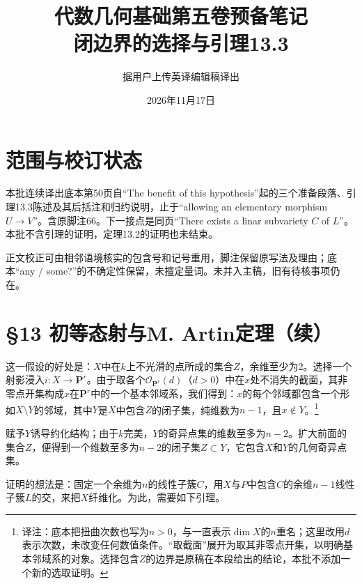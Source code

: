 \documentclass[openany,fontset=fandol]{ctexbook}
\newcommand{\note}[1]{\footnote{译注：#1}}
\begin{document}
\title{代数几何基础第五卷预备笔记\\闭边界的选择与引理13.3}
\author{据用户上传英译编辑稿译出}
\date{2026年11月17日}
\maketitle
\chapter*{范围与校订状态}
本批连续译出底本第50页自“The benefit of this hypothesis”起的三个准备段落、引理13.3陈述及其后括注和归约说明，止于“allowing an elementary morphism $U\to V$”。含原脚注66。下一接点是同页“There exists a linar subvariety $C$ of $L$”。本批不含引理的证明，定理13.2的证明也未结束。

正文校正可由相邻语境核实的包含号和记号重用，脚注保留原写法及理由；底本“any / some?”的不确定性保留，未擅定量词。未并入主稿，旧有待核事项仍在。
\chapter*{§13 初等态射与M. Artin定理（续）}
这一假设的好处是：$X$中在$k$上不光滑的点所成的集合$Z$，余维至少为2。选择一个射影浸入$i\colon X\to\mathbf P^r$。由于取各个$\mathcal O_{\mathbf P^r}(d)$（$d>0$）中在$x$处不消失的截面，其非零点开集构成$x$在$\mathbf P^r$中的一个基本邻域系，我们得到：$x$的每个邻域都包含一个形如$X\setminus Y$的邻域，其中$Y$是$X$中包含$Z$的闭子集，纯维数为$n-1$，且$x\notin Y$。\note{底本把扭曲次数也写为$n>0$，与一直表示$\dim X$的$n$重名；这里改用$d$表示次数，未改变任何数值条件。“取截面”展开为取其非零点开集，以明确基本邻域系的对象。选择包含$Z$的边界是原稿在本段给出的结论，本批不添加一个新的选取证明。}

赋予$Y$诱导约化结构；由于$k$完美，$Y$的奇异点集的维数至多为$n-2$。扩大前面的集合$Z$，便得到一个维数至多为$n-2$的闭子集$Z\subset Y$，它包含$X$和$Y$的几何奇异点集。

证明的想法是：固定一个余维为$n$的线性子簇$C$，用$X$与$P$中包含$C$的余维$n-1$线性子簇$L$的交，来把$X$纤维化。为此，需要如下引理。
\end{document}
